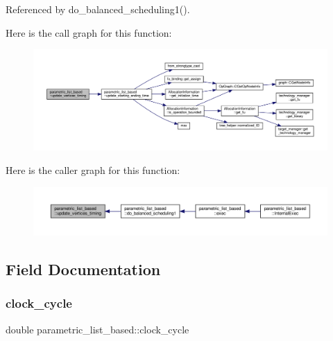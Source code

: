 Referenced by do\+\_\+balanced\+\_\+scheduling1().

Here is the call graph for this function\+:
\nopagebreak
\begin{figure}[H]
\begin{center}
\leavevmode
\includegraphics[width=350pt]{d7/d47/classparametric__list__based_aff2bc058e15e80cd66b5e33245771289_cgraph}
\end{center}
\end{figure}
Here is the caller graph for this function\+:
\nopagebreak
\begin{figure}[H]
\begin{center}
\leavevmode
\includegraphics[width=350pt]{d7/d47/classparametric__list__based_aff2bc058e15e80cd66b5e33245771289_icgraph}
\end{center}
\end{figure}


\subsection{Field Documentation}
\mbox{\label{classparametric__list__based_af67d32b45cbe56df18bd4c1356d3ac0e}} 
\subsubsection{\texorpdfstring{clock\+\_\+cycle}{clock\_cycle}}
{\footnotesize\ttfamily double parametric\+\_\+list\+\_\+based\+::clock\+\_\+cycle\hspace{0.3cm}{\ttfamily [private]}}



